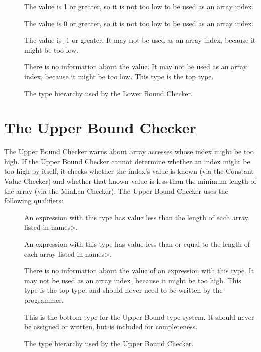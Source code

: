 \begin{description}
\item[]
  The value is 1 or greater, so it is not too low to be used as an array index.
\item[]
  The value is 0 or greater, so it is not too low to be used as an array index.
\item[]
  The value is -1 or greater.
  It may not be used as an array index, because it might be too low.
\item[]
  There is no information about the value.
  It may not be used as an array index, because it might be too low.
  This type is the top type.
\end{description}

\begin{figure}
  \caption{The type hierarchy used by the Lower Bound Checker.}
  \label{fig-lowerbound-types}
\end{figure}


\section{The Upper Bound Checker\label{index-upperbound}}

The Upper Bound Checker warns about array accesses whose index might be
too high. If the Upper Bound Checker cannot determine whether an index might
be too high by itself, it checks whether the index's value is known (via the Constant
Value Checker) and whether that known value is less than the minimum length of the
array (via the MinLen Checker). The Upper Bound Checker uses the following
qualifiers:

\begin{description}
\item[]
  An expression with this type
  has value less than the length of each array listed in \<names>.
\item[]
  An expression with this type
  has value less than or equal to the length of each array listed in \<names>.
\item[]
  There is no information about the value of an expression with this type.
  It may not be used as an array index, because it might be too high.
  This type is the top type, and should never need to be written by the
  programmer.
\item[]
  This is the bottom type for the Upper Bound type system. It should
  never be assigned or written, but is included for completeness.
  \end{description}

\begin{figure}
  \caption{The type hierarchy used by the Upper Bound Checker.}
  \label{fig-upperbound-types}
\end{figure}
